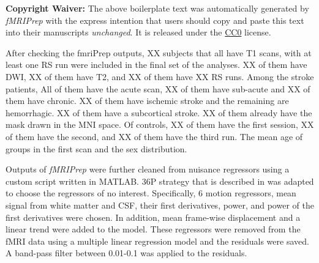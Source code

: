 \documentclass[fleqn,10pt]{wlscirep}
\begin{document}
\textbf{Copyright Waiver:} The above boilerplate text was automatically generated by \emph{fMRIPrep} with the express intention that users should copy and paste
this text into their manuscripts \emph{unchanged}. It is released under
the \href{https://creativecommons.org/publicdomain/zero/1.0/}{CC0}
license.

After checking the fmriPrep outputs, XX subjects that all have T1 scans, with at least one RS run were included in the final set of the analyses. XX of them have DWI, XX of them have T2, and XX of them have XX RS runs. Among the stroke patients, All of them have the acute scan, XX of them have sub-acute and XX of them have chronic. XX of them have ischemic stroke and the remaining are hemorrhagic.  XX of them have a subcortical stroke. XX of them already have the mask drawn in the  MNI space. Of controls, XX of them have the first session, XX of them have the second, and XX of them have the third run. The mean age of groups in the first scan and the sex distribution. 

Outputs of \emph{fMRIPrep} were further cleaned from nuisance regressors using a custom script written in MATLAB. 36P strategy that is described in \citet{satterthwaite_2013} was adapted to choose the regressors of no interest. Specifically, 6 motion regressors, mean signal from white matter and CSF, their first derivatives, power, and power of the first derivatives were chosen. In addition, mean frame-wise displacement and a linear trend were added to the model. These regressors were removed from the fMRI data using a multiple linear regression model and the residuals were saved. A band-pass filter between 0.01-0.1 was applied to the residuals. 


%



\end{document}
